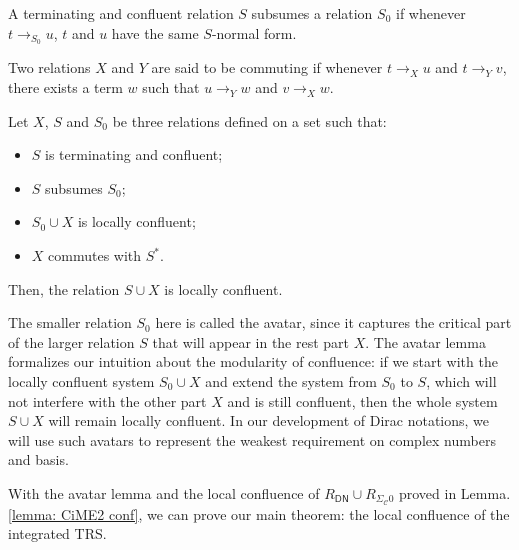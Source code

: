 \documentclass[manuscript, review, timestamp]{acmart}
\begin{document}


\begin{definition}[Subsumption]
  A terminating and confluent relation $S$ subsumes a relation $S_0$ if whenever $t \to_{S_0} u$, $t$ and $u$ have the same $S$-normal form.
\end{definition}

\begin{definition}
  Two relations $X$ and $Y$ are said to be commuting if whenever $t \to_X u$ and $t \to_Y v$, there exists a term $w$ such that $u \to_Y w$ and $v \to_X w$.
\end{definition}

\begin{lemma} \cite{Arrighi2005} Let $X$, $S$ and $S_0$ be three relations defined on a set such that:
  \begin{itemize}
    \item $S$ is terminating and confluent;
    \item $S$ subsumes $S_0$;
    \item $S_0 \cup X$ is locally confluent;
    \item $X$ commutes with $S^*$.
  \end{itemize}
  Then, the relation $S \cup X$ is locally confluent.
\end{lemma}

The smaller relation $S_0$ here is called the avatar, since it captures the critical part of the larger relation $S$ that will appear in the rest part $X$. The avatar lemma formalizes our intuition about the modularity of confluence: if we start with the locally confluent system $S_0 \cup X$ and extend the system from $S_0$ to $S$, which will not interfere with the other part $X$ and is still confluent, then the whole system $S\cup X$ will remain locally confluent. In our development of Dirac notations, we will use such avatars to represent the weakest requirement on complex numbers and basis.

With the avatar lemma and the local confluence of $R_\textsf{DN} \cup R_{\Sigma_\mathcal{C}0}$ proved in Lemma.\ref{lemma: CiME2 conf}, we can prove our main theorem: the local confluence of the integrated TRS.
\end{document}
